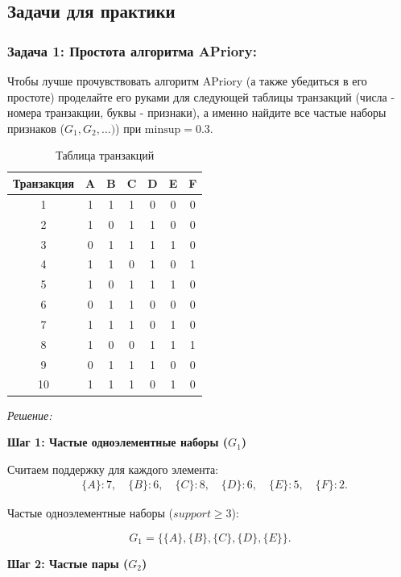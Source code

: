 \subsection{Задачи для практики}

\subsubsection{Задача 1: Простота алгоритма APriory:} Чтобы лучше прочувствовать алгоритм APriory (а также убедиться в его простоте) проделайте его руками для следующей таблицы транзакций (числа - номера транзакции, буквы - признаки), а именно найдите все частые наборы признаков (\(G_1, G_2, \ldots)\)) при \( \text{minsup}=0.3 \).
\begin{table}[ht!]
\centering
\caption{Таблица транзакций}
\begin{tabular}{ccccccc}
\toprule
\textbf{Транзакция} & \textbf{A} & \textbf{B} & \textbf{C} & \textbf{D} & \textbf{E} & \textbf{F} \\
\midrule
1  & 1 & 1 & 1 & 0 & 0 & 0 \\
2  & 1 & 0 & 1 & 1 & 0 & 0 \\
3  & 0 & 1 & 1 & 1 & 1 & 0 \\
4  & 1 & 1 & 0 & 1 & 0 & 1 \\
5  & 1 & 0 & 1 & 1 & 1 & 0 \\
6  & 0 & 1 & 1 & 0 & 0 & 0 \\
7  & 1 & 1 & 1 & 0 & 1 & 0 \\
8  & 1 & 0 & 0 & 1 & 1 & 1 \\
9  & 0 & 1 & 1 & 1 & 0 & 0 \\
10 & 1 & 1 & 1 & 0 & 1 & 0 \\
\bottomrule
\end{tabular}
\end{table}
\newline
\textit{Решение:}

\textbf{Шаг 1: Частые одноэлементные наборы (\( G_1 \))}

Считаем поддержку для каждого элемента:
\[
\begin{aligned}
&\{A\}: 7, \quad \{B\}: 6, \quad \{C\}: 8, \quad \{D\}: 6, \quad \{E\}: 5, \quad \{F\}: 2.
\end{aligned}
\]

Частые одноэлементные наборы (\( support \geq 3 \)):

\[
G_1 = \{\{A\}, \{B\}, \{C\}, \{D\}, \{E\}\}.
\]

\textbf{Шаг 2: Частые пары (\( G_2 \))}

